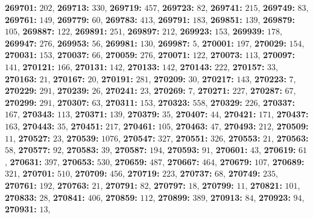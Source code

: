 \textsf{\bfseries 269701:} $202$, \textsf{\bfseries 269713:} $330$, \textsf{\bfseries 269719:} $457$, \textsf{\bfseries 269723:} $82$, \textsf{\bfseries 269741:} $215$, \textsf{\bfseries 269749:} $83$, \textsf{\bfseries 269761:} $149$, \textsf{\bfseries 269779:} $60$, \textsf{\bfseries 269783:} $413$, \textsf{\bfseries 269791:} $183$, \textsf{\bfseries 269851:} $139$, \textsf{\bfseries 269879:} $105$, \textsf{\bfseries 269887:} $122$, \textsf{\bfseries 269891:} $251$, \textsf{\bfseries 269897:} $212$, \textsf{\bfseries 269923:} $153$, \textsf{\bfseries 269939:} $178$, \textsf{\bfseries 269947:} $276$, \textsf{\bfseries 269953:} $56$, \textsf{\bfseries 269981:} $130$, \textsf{\bfseries 269987:} $5$, \textsf{\bfseries 270001:} $197$, \textsf{\bfseries 270029:} $154$, \textsf{\bfseries 270031:} $153$, \textsf{\bfseries 270037:} $66$, \textsf{\bfseries 270059:} $276$, \textsf{\bfseries 270071:} $122$, \textsf{\bfseries 270073:} $113$, \textsf{\bfseries 270097:} $141$, \textsf{\bfseries 270121:} $166$, \textsf{\bfseries 270131:} $142$, \textsf{\bfseries 270133:} $142$, \textsf{\bfseries 270143:} $222$, \textsf{\bfseries 270157:} $33$, \textsf{\bfseries 270163:} $21$, \textsf{\bfseries 270167:} $20$, \textsf{\bfseries 270191:} $281$, \textsf{\bfseries 270209:} $30$, \textsf{\bfseries 270217:} $143$, \textsf{\bfseries 270223:} $7$, \textsf{\bfseries 270229:} $291$, \textsf{\bfseries 270239:} $26$, \textsf{\bfseries 270241:} $23$, \textsf{\bfseries 270269:} $7$, \textsf{\bfseries 270271:} $227$, \textsf{\bfseries 270287:} $67$, \textsf{\bfseries 270299:} $291$, \textsf{\bfseries 270307:} $63$, \textsf{\bfseries 270311:} $153$, \textsf{\bfseries 270323:} $558$, \textsf{\bfseries 270329:} $226$, \textsf{\bfseries 270337:} $167$, \textsf{\bfseries 270343:} $113$, \textsf{\bfseries 270371:} $139$, \textsf{\bfseries 270379:} $35$, \textsf{\bfseries 270407:} $44$, \textsf{\bfseries 270421:} $171$, \textsf{\bfseries 270437:} $163$, \textsf{\bfseries 270443:} $35$, \textsf{\bfseries 270451:} $217$, \textsf{\bfseries 270461:} $105$, \textsf{\bfseries 270463:} $47$, \textsf{\bfseries 270493:} $212$, \textsf{\bfseries 270509:} $11$, \textsf{\bfseries 270527:} $23$, \textsf{\bfseries 270539:} $1076$, \textsf{\bfseries 270547:} $327$, \textsf{\bfseries 270551:} $326$, \textsf{\bfseries 270553:} $21$, \textsf{\bfseries 270563:} $58$, \textsf{\bfseries 270577:} $92$, \textsf{\bfseries 270583:} $39$, \textsf{\bfseries 270587:} $194$, \textsf{\bfseries 270593:} $91$, \textsf{\bfseries 270601:} $43$, \textsf{\bfseries 270619:} $61$, \textsf{\bfseries 270631:} $397$, \textsf{\bfseries 270653:} $530$, \textsf{\bfseries 270659:} $487$, \textsf{\bfseries 270667:} $464$, \textsf{\bfseries 270679:} $107$, \textsf{\bfseries 270689:} $321$, \textsf{\bfseries 270701:} $510$, \textsf{\bfseries 270709:} $456$, \textsf{\bfseries 270719:} $223$, \textsf{\bfseries 270737:} $68$, \textsf{\bfseries 270749:} $235$, \textsf{\bfseries 270761:} $192$, \textsf{\bfseries 270763:} $21$, \textsf{\bfseries 270791:} $82$, \textsf{\bfseries 270797:} $18$, \textsf{\bfseries 270799:} $11$, \textsf{\bfseries 270821:} $101$, \textsf{\bfseries 270833:} $28$, \textsf{\bfseries 270841:} $406$, \textsf{\bfseries 270859:} $112$, \textsf{\bfseries 270899:} $389$, \textsf{\bfseries 270913:} $84$, \textsf{\bfseries 270923:} $94$, \textsf{\bfseries 270931:} $13$, 
